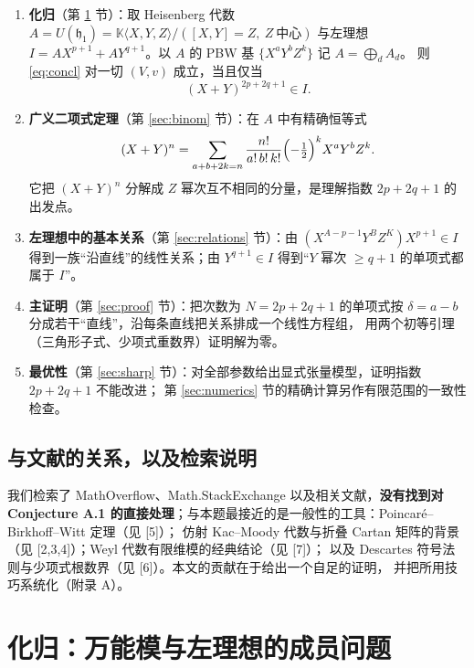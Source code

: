 \documentclass[11pt,UTF8]{ctexart}
\theoremstyle{definition}
\newcommand{\K}{\mathbb{K}}
\newcommand{\hh}{\mathfrak{h}}
\begin{document}
\begin{enumerate}[label=(\roman*)]
\item \textbf{化归}（第 \ref{sec:reduce} 节）：取 Heisenberg 代数
$A=U(\hh_1)=\K\langle X,Y,Z\rangle/([X,Y]=Z,\ Z\ \text{中心})$ 与左理想
$I=AX^{p+1}+AY^{q+1}$。以 $A$ 的 PBW 基 $\{X^aY^bZ^k\}$ 记 $A=\bigoplus_d A_d$。
则 \eqref{eq:concl} 对一切 $(V,v)$ 成立，当且仅当
\begin{equation}\label{eq:membership}
(X+Y)^{2p+2q+1}\in I .
\end{equation}
\item \textbf{广义二项式定理}（第 \ref{sec:binom} 节）：在 $A$ 中有精确恒等式
\begin{equation}\label{eq:trinomial}
(X+Y)^{n}=\sum_{a+b+2k=n}\frac{n!}{a!\,b!\,k!}\Bigl(-\tfrac12\Bigr)^{k}X^{a}Y^{b}Z^{k}.
\end{equation}
它把 $(X+Y)^n$ 分解成 $Z$ 幂次互不相同的分量，是理解指数 $2p+2q+1$ 的出发点。
\item \textbf{左理想中的基本关系}（第 \ref{sec:relations} 节）：由 $(X^{A-p-1}Y^BZ^K)X^{p+1}\in I$
得到一族“沿直线”的线性关系；由 $Y^{q+1}\in I$ 得到“$Y$ 幂次 $\ge q+1$ 的单项式都属于 $I$”。
\item \textbf{主证明}（第 \ref{sec:proof} 节）：把次数为 $N=2p+2q+1$ 的单项式按
$\delta=a-b$ 分成若干“直线”，沿每条直线把关系排成一个线性方程组，
用两个初等引理（三角形子式、少项式重数界）证明解为零。
\item \textbf{最优性}（第 \ref{sec:sharp} 节）：对全部参数给出显式张量模型，证明指数 $2p+2q+1$ 不能改进；
第 \ref{sec:numerics} 节的精确计算另作有限范围的一致性检查。
\end{enumerate}

\subsection{与文献的关系，以及检索说明}

我们检索了 MathOverflow、Math.StackExchange 以及相关文献，\textbf{没有找到对 Conjecture A.1
的直接处理}；与本题最接近的是一般性的工具：Poincaré--Birkhoff--Witt 定理（见 [5]）；
仿射 Kac--Moody 代数与折叠 Cartan 矩阵的背景（见 [2,3,4]）；Weyl 代数有限维模的经典结论（见 [7]）；
以及 Descartes 符号法则与少项式根数界（见 [6]）。本文的贡献在于给出一个自足的证明，
并把所用技巧系统化（附录 A）。

\section{化归：万能模与左理想的成员问题}\label{sec:reduce}
\end{document}
